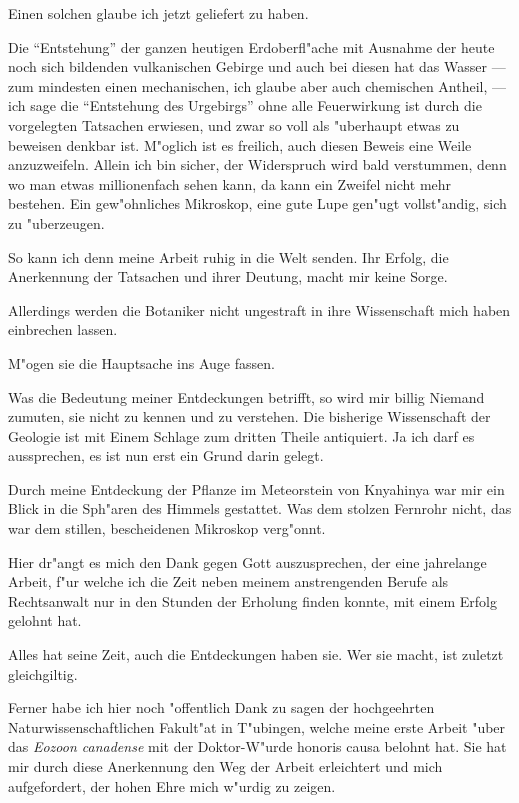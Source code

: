 \documentclass[a4paper, 11pt, oneside, german]{article}
\begin{document}
Einen solchen glaube ich jetzt geliefert zu haben.

Die "`Entstehung"' der ganzen heutigen Erdoberfl"ache mit Ausnahme der heute noch sich bildenden vulkanischen Gebirge und auch bei diesen hat das Wasser --- zum mindesten einen mechanischen, ich glaube aber auch chemischen Antheil, --- ich sage die "`Entstehung des Urgebirgs"' ohne alle Feuerwirkung ist durch die vorgelegten Tatsachen erwiesen, und zwar so voll als "uberhaupt etwas zu beweisen denkbar ist. M"oglich ist es freilich, auch diesen Beweis eine Weile anzuzweifeln. Allein ich bin sicher, der Widerspruch wird bald verstummen, denn wo man etwas millionenfach sehen kann, da kann ein Zweifel nicht mehr bestehen. Ein gew"ohnliches Mikroskop, eine gute Lupe gen"ugt vollst"andig, sich zu "uberzeugen.

So kann ich denn meine Arbeit ruhig in die Welt senden. Ihr Erfolg, die Anerkennung der Tatsachen und ihrer Deutung, macht mir keine Sorge.

Allerdings werden die Botaniker nicht ungestraft in ihre Wissenschaft mich haben einbrechen lassen.

M"ogen sie die Hauptsache ins Auge fassen.

Was die Bedeutung meiner Entdeckungen betrifft, so wird mir billig Niemand zumuten, sie nicht zu kennen und zu verstehen. Die bisherige Wissenschaft der Geologie ist mit Einem Schlage zum dritten Theile antiquiert. Ja ich darf es aussprechen, es ist nun erst ein Grund darin gelegt.

Durch meine Entdeckung der Pflanze im Meteorstein von Knyahinya war mir ein Blick in die Sph"aren des Himmels gestattet. Was dem stolzen Fernrohr nicht, das war dem stillen, bescheidenen Mikroskop verg"onnt.

Hier dr"angt es mich den Dank gegen Gott auszusprechen, der eine jahrelange Arbeit, f"ur welche ich die Zeit neben meinem anstrengenden Berufe als Rechtsanwalt nur in den Stunden der Erholung finden konnte, mit einem Erfolg gelohnt hat.

Alles hat seine Zeit, auch die Entdeckungen haben sie. Wer sie macht, ist zuletzt gleichgiltig.

Ferner habe ich hier noch "offentlich Dank zu sagen der hochgeehrten Naturwissenschaftlichen Fakult"at in T"ubingen, welche meine erste Arbeit "uber das \emph{Eozoon canadense} mit der Doktor-W"urde honoris causa belohnt hat. Sie hat mir durch diese Anerkennung den Weg der Arbeit erleichtert und mich aufgefordert, der hohen Ehre mich w"urdig zu zeigen.
\end{document}
